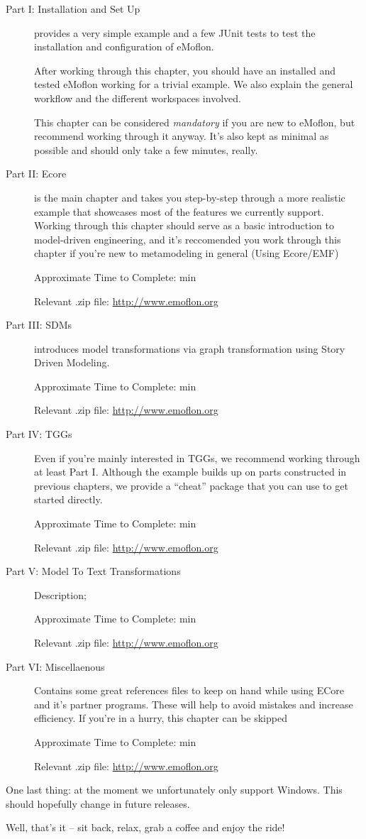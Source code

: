 \begin{description}

\item[Part I: Installation and Set Up]provides a very simple example and a few JUnit tests to test the installation and configuration of eMoflon.
 
After working through this chapter, you should have an installed and tested eMoflon working for a trivial example.
We also explain the general workflow and the different workspaces involved.

This chapter can be considered \emph{mandatory} if you are new to eMoflon, but recommend working through it anyway.
It's also kept as minimal as possible and should only take a few minutes, really.

\vspace{0.5cm}

\item[Part II: Ecore] is the main chapter and takes you step-by-step through a more realistic example that showcases most of the features we currently support.
Working through this chapter should serve as a basic introduction to model-driven engineering, and it's reccomended you work through this chapter if you're new to metamodeling in general (Using Ecore/EMF) %

{\small Approximate Time to Complete: min

Relevant .zip file: \url{http://www.emoflon.org} }

\item[Part III: SDMs] introduces model transformations via graph transformation using Story Driven Modeling.

{\small Approximate Time to Complete: min

Relevant .zip file: \url{http://www.emoflon.org} }

\item[Part IV: TGGs] Even if you're mainly interested in TGGs, we recommend working through at least Part I. Although the example builds up on parts constructed in previous chapters, we provide a ``cheat'' package that you can use to get started directly.

{\small Approximate Time to Complete: min

Relevant .zip file: \url{http://www.emoflon.org} }

\item[Part V: Model To Text Transformations] Description;

{\small Approximate Time to Complete: min

Relevant .zip file: \url{http://www.emoflon.org} }

\item[Part VI: Miscellaenous] Contains some great references files to keep on hand while using ECore and it's partner programs. These will help to avoid mistakes and increase efficiency. %
If you're in a hurry, this chapter can be skipped

{\small Approximate Time to Complete: min

Relevant .zip file: \url{http://www.emoflon.org} }

\end{description}

One last thing: at the moment we unfortunately only support Windows. This should hopefully change in future releases.

Well, that's it -- sit back, relax, grab a coffee and enjoy the ride!

